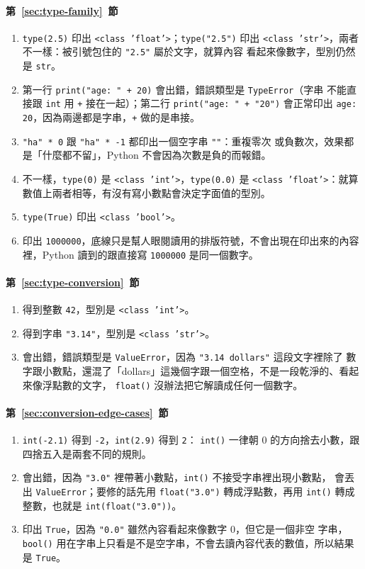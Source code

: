 \paragraph{第~\ref{sec:type-family}~節}
\begin{enumerate}
\item \texttt{type(2.5)} 印出 \texttt{<class 'float'>}；\texttt{type("2.5")} 印出
\texttt{<class 'str'>}，兩者不一樣：被引號包住的 \texttt{"2.5"} 屬於文字，就算內容
看起來像數字，型別仍然是 \texttt{str}。
\item 第一行 \texttt{print("age: " + 20)} 會出錯，錯誤類型是 \texttt{TypeError}（字串
不能直接跟 \texttt{int} 用 \texttt{+} 接在一起）；第二行 \texttt{print("age: " +
"20")} 會正常印出 \texttt{age: 20}，因為兩邊都是字串，\texttt{+} 做的是串接。
\item \texttt{"ha" * 0} 跟 \texttt{"ha" * -1} 都印出一個空字串 \texttt{""}：重複零次
或負數次，效果都是「什麼都不留」，Python 不會因為次數是負的而報錯。
\item 不一樣，\texttt{type(0)} 是 \texttt{<class 'int'>}，\texttt{type(0.0)} 是
\texttt{<class 'float'>}：就算數值上兩者相等，有沒有寫小數點會決定字面值的型別。
\item \texttt{type(True)} 印出 \texttt{<class 'bool'>}。
\item 印出 \texttt{1000000}，底線只是幫人眼閱讀用的排版符號，不會出現在印出來的內容
裡，Python 讀到的跟直接寫 \texttt{1000000} 是同一個數字。
\end{enumerate}

\paragraph{第~\ref{sec:type-conversion}~節}
\begin{enumerate}
\item 得到整數 \texttt{42}，型別是 \texttt{<class 'int'>}。
\item 得到字串 \texttt{"3.14"}，型別是 \texttt{<class 'str'>}。
\item 會出錯，錯誤類型是 \texttt{ValueError}，因為 \texttt{"3.14 dollars"} 這段文字裡除了
數字跟小數點，還混了「dollars」這幾個字跟一個空格，不是一段乾淨的、看起來像浮點數的文字，
\texttt{float()} 沒辦法把它解讀成任何一個數字。
\end{enumerate}

\paragraph{第~\ref{sec:conversion-edge-cases}~節}
\begin{enumerate}
\item \texttt{int(-2.1)} 得到 \texttt{-2}，\texttt{int(2.9)} 得到 \texttt{2}：
\texttt{int()} 一律朝 0 的方向捨去小數，跟四捨五入是兩套不同的規則。
\item 會出錯，因為 \texttt{"3.0"} 裡帶著小數點，\texttt{int()} 不接受字串裡出現小數點，
會丟出 \texttt{ValueError}；要修的話先用 \texttt{float("3.0")} 轉成浮點數，再用
\texttt{int()} 轉成整數，也就是 \texttt{int(float("3.0"))}。
\item 印出 \texttt{True}，因為 \texttt{"0.0"} 雖然內容看起來像數字 0，但它是一個非空
字串，\texttt{bool()} 用在字串上只看是不是空字串，不會去讀內容代表的數值，所以結果是
\texttt{True}。
\end{enumerate}
